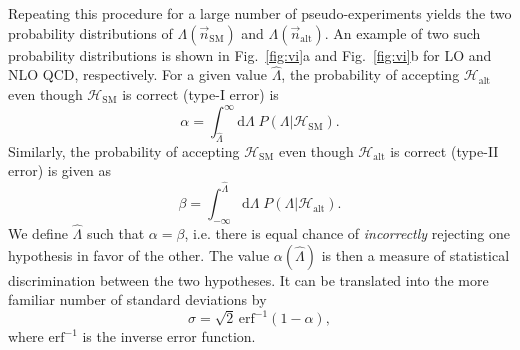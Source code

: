 \documentclass[preprint]{JHEP3} %
\newcommand{\SM}{\mathrm{SM}}
\newcommand{\alt}{\mathrm{alt}}
\def\hLambda {\hat{\Lambda}}
\def\erf{\mathrm{erf}}
\def\HSM{\mathcal{H}_{\mathrm{SM}}}
\def\Halt{\mathcal{H}_{\mathrm{alt}}}
\newcommand{\be}{\begin{eqnarray}}
\newcommand{\ee}{\end{eqnarray}}
\begin{document}
Repeating this procedure for a large number of pseudo-experiments yields the two probability distributions of $\Lambda(\vec{n}_\mathrm{SM})$ and $\Lambda(\vec{n}_\mathrm{alt})$. 
An example of two such probability distributions is shown in Fig.~\ref{fig:vi}a and Fig.~\ref{fig:vi}b for LO and NLO QCD, respectively. 
For a given value $\hat{\Lambda}$, the probability of accepting $\mathcal{H}_{\alt}$ even though $\mathcal{H}_{\SM}$ is correct (type-I error) is
\begin{equation}
    \alpha = \int_{\hLambda}^{\infty} \mathrm{d}\Lambda \; P(\Lambda | {\HSM}).
\end{equation}
Similarly, the probability of accepting $\mathcal{H}_{\SM}$ even though $\mathcal{H}_{\alt}$ is correct (type-II error) is given as 
\begin{equation}
    \beta = \int^{\hLambda}_{-\infty} \mathrm{d}\Lambda \; P(\Lambda|\Halt).
\end{equation}
We define $\hLambda$ such that $\alpha=\beta$, i.e. there is equal chance of {\it incorrectly} rejecting one hypothesis in favor of the other. 
The value $\alpha(\hLambda)$ is then a measure of statistical discrimination between the two hypotheses. 
It can be translated into the more familiar number of standard deviations by 
\begin{equation}
\sigma = \sqrt{2} \, \erf^{-1}(1-\alpha),
\end{equation}
where $\erf^{-1}$ is the inverse error function. 
\end{document}

